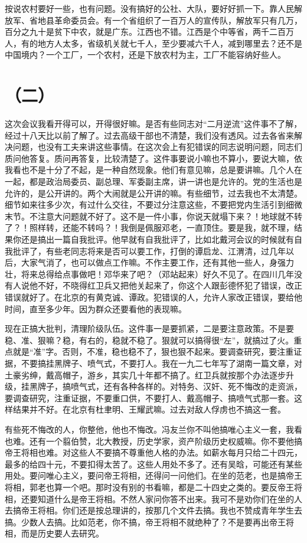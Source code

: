 按说农村要好一些，也有问题。没有搞好的公社、大队，要好好抓一下。靠人民解放军、省地县革命委员会。有一个省组织了一百万人的宣传队，解放军只有几万，百分之九十是贫下中农，就是广东。江西也不错。江西是个中等省，两千二百万人，有的地方人太多，省级机关就七千人，至少要减六千人，减到哪里去？还不是中国境内？一个工厂，一个农村，还是下放农村为主，工厂不能容纳好些人。

\date{一九六八年十月三十一日闭幕式上的讲话}
\section*{（二）}

这次会议我看开得可以，开得很好嘛。是否有些同志对“二月逆流”这件事不了解，经过十八天比以前了解了。过去高级干部也不清楚，我们没有透风。过去各省来解决问题，也没有工夫来讲这些事情。在这次会上有犯错误的同志说明问题，同志们质问他答复。质问再答复，比较清楚了。这件事要说小嘛也不算小，要说大嘛，依我看也不是十分了不起，是一种自然现象。他们有意见嘛，总是要讲嘛。几个人在一起，都是政治局委员、副总理、军委副主席，讲一讲也是允许的。党的生活也是允许的，是公开讲的。两个大闹就是公开讲的嘛。有些细节，过去我也不太清楚。细节如来往多少次，有过什么交往，不要过分注意这些，不要把党内生活引到细微末节。不注意大问题就不好了。这不是一件小事，你说天就塌下来？！地球就不转了？！照样转，还能不转吗？！我倒是佩服邓老，一直顶住。要是我，就不理，结果你还是搞出一篇自我批评。他早就有自我批评了，比如北戴河会议的时候就有自我批评了，有些老同志将来是否可以要工作，打倒的谭启龙、江渭清，过几年以后，大家气消了，也可以做点工作嘛。不作主要工作，还有其他一些人，身强力壮，将来总得给点事做吧！邓华来了吧？（邓站起来）好久不见了。在四川几年没有人说他不好，不晓得红卫兵又把他关起来了，你这个人跟彭德怀犯了错误，改正错误就好了。在北京的有黄克诚、谭政。犯错误的人，允许人家改正错误，要给他时间，直至多少年。因为群众还要看他的表现嘛。

现在正搞大批判，清理阶级队伍。这件事一是要抓紧，二是要注意政策。不是要稳、准、狠嘛？稳，有右的，稳就不稳了。狠就可以搞得很“左”，就搞过了火。重点就是“准”字。否则，不准，稳也稳不了，狠也狠不起来。要调查研究，要注重证据，不要搞挂黑牌子、喷气式，不要打人。我在一九二七年写了湖南一篇文章，对土豪劣绅，戴高帽子，游乡，其实几十年都不搞了。红卫兵就按那个办法逐步升级，挂黑牌子，搞喷气式，还有各种各样的。对特务、汉奸、死不悔改的走资派，要调查研究，注重证据，不要重口供，不要打人、戴高帽子、搞喷气式那一套。这样结果并不好。在北京有杜聿明、王耀武嘛。过去对敌人俘虏也不搞这一套。

有些死不悔改的人，你整他，他也不悔改。冯友兰你不叫他搞唯心主义一套，我看也难。还有一个翦伯赞，北大教授，历史学家，资产阶级历史权威嘛。你不要他搞帝王将相也难。对这些人不要搞不尊重他人格的办法。如薪水每月只给二十四元，最多的给四十元，不要扣得太苦了。这些人用处不多了。还有吴晗，可能还有某些用处。要问唯心主义，要问帝王将相，还得问一问他们。在坐的范老，也是搞帝王将相，郭老也算一个吧。那时没有别的书看嘛，都是二十四史之类的。要反帝王将相，还要知道什么是帝王将相。不然人家问你答不出来。我可不是劝你们在坐的人去搞帝王将相。你们还是按总理讲的，按那几个文件去搞。我也不赞成青年学生去搞。少数人去搞。比如范老，你不搞，帝王将相不就绝种了？不是要再出帝王将相，而是历史要人去研究。

